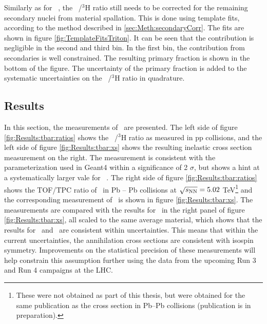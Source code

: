 Similarly as for \ahe\ , the \atrit\ /$^3\mathrm{H}$ ratio still needs to be corrected for the remaining secondary nuclei from material spallation. This is done using template fits, according to the method described in \ref{sec:Meth:secondaryCorr}. The fits are shown in figure \ref{fig:TemplateFitsTriton}. It can be seen that the contribution is negligible in the second and third bin. In the first bin, the contribution from secondaries is well constrained. The resulting primary fraction is shown in the bottom of the figure. The uncertainty of the primary fraction is added to the systematic uncertainties on the \atrit\ /$^3\mathrm{H}$ ratio in quadrature.


\subsection{Results}
In this section, the measurements of \sigmainelH\ are presented. The left side of figure \ref{fig:Results:tbar:ratios} shows the \atrit\ /$^3\mathrm{H}$ ratio as measured in pp collisions, and the left side of figure \ref{fig:Results:tbar:xs} shows the resulting inelastic cross section measurement on the right. The measurement is consistent with the parameterization used in Geant4 within a significance of 2 $\sigma$, but shows a hint at a systematically larger vale for \sigmainelH\ . The right side of figure \ref{fig:Results:tbar:ratios} shows the TOF/TPC ratio of \atrit\ in Pb -- Pb collisions at $\sqrt{s_{\rm{NN}}}=5.02$ TeV\footnote{These were not obtained as part of this thesis, but were obtained for the same publication as the cross section in Pb--Pb collisions (publication is in preparation).} and the corresponding measurement of \sigmainelH\ is shown in figure \ref{fig:Results:tbar:xs}. The measurements are compared with the results for \ahe\ in the right panel of figure \ref{fig:Results:tbar:xs}, all scaled to the same average material, which shows that the results for \atrit\ and \ahe\ are consistent within uncertainties. This means that within the current uncertainties, the annihilation cross sections are consistent with isospin symmetry. Improvements on the statistical precision of these measurements will help constrain this assumption further using the data from the upcoming Run 3 and Run 4 campaigns at the LHC. 

